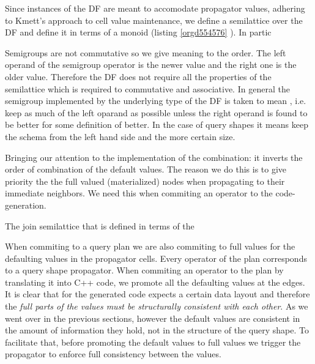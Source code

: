 Since instances of the DF are meant to accomodate propagator values,
adhering to Kmett's approach to cell value maintenance, we define a
semilattice over the DF and define it in terms of a monoid (listing
\ref{orgd554576} ). In partic

Semigroups are not commutative so we give meaning to the order. The
left operand of the semigroup operator is the newer value and the
right one is the older value. Therefore the DF does not require all
the properties of the semilattice which is required to commutative and
associative. In general the semigroup implemented by the underlying
type of the DF is taken to mean , i.e. keep as
much of the left oparand as possible unless the right operand is found
to be better for some definition of better. In the case of query
shapes it means keep the schema from the left hand side and the more
certain size.

Bringing our attention to the implementation of the 
combination: it inverts the order of combination of the default
values. The reason we do this is to give priority the the full valued
(materialized) nodes when propagating to their immediate neighbors. We
need this when commiting an operator to the code-generation.

\begin{code}
  \caption{\label{orgd554576}The join semilattice that is defined in terms of the}
\end{code}

When commiting to a query plan we are also commiting to full values
for the defaulting values in the propagator cells. Every operator of
the plan corresponds to a query shape propagator. When commiting an
operator to the plan by translating it into C++ code, we promote all
the defaulting values at the edges. It is clear that for the generated
code expects a certain data layout and therefore the \emph{full parts
  of the values must be structurally consistent with each other}. As
we went over in the previous sections, however the default values are
consistent in the amount of information they hold, not in the
structure of the query shape. To facilitate that, before promoting the
default values to full values we trigger the propagator to enforce
full consistency between the values.

